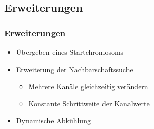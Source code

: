 
\subsection{Erweiterungen}

\begin{frame}
\frametitle{Erweiterungen}
    \begin{itemize}
        \item Übergeben eines Startchromosoms
        \item Erweiterung der Nachbarschaftssuche
            \begin{itemize}
                \item Mehrere Kanäle gleichzeitig verändern
                \item Konstante Schrittweite der Kanalwerte
            \end{itemize}
        \item Dynamische Abkühlung
    \end{itemize}
\end{frame}
